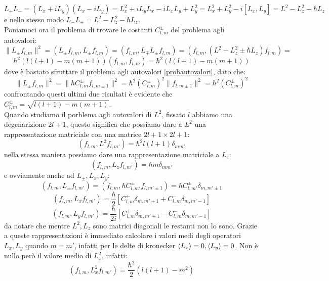 \[L_+L_- = (L_x+iL_y)(L_x-iL_y) = L_x^2 + iL_yL_x -iL_xL_y + L_y^2 = L_x^2+L_y^2 -i[L_x,L_y] = L^2-L_z^2 +\hbar L_z\]
e nello stesso modo $L_-L_+ = L^2-L_z^2-\hbar L_z$.
\\Poniamoci ora il problema di trovare le costanti $C^{\pm}_{l,m}$ del problema agli autovalori:
\[\|L_\pm f_{l,m}\|^2 = (L_\pm f_{l,m}, L_\pm f_{l,m}) = (f_{l,m},L_\mp L_\pm f_{l,m}) = (f_{l,m}, (L^2 -L_z^2\pm \hbar L_z)f_{l,m}) =\]
\[\hbar^2(l(l+1)-m(m+1))(f_{l,m},f_{l,m})=\hbar^2(l(l+1)-m(m+1)) \]
dove è bastato sfruttare il problema agli autovalori \eqref{probautovalori}, dato che:
\[\|L_\pm f_{l,m}\|^2 = \|\hbar C^{\pm}_{l,m} f_{l,m\pm1}\|^2 = \hbar^2 (C^{\pm}_{l,m})^2 \|f_{l,m\pm1}\|^2 = \hbar^2 (C^{\pm}_{l,m})^2\]
confrontando questi ultimi due risultati è evidente che $C^{\pm}_{l,m} = \sqrt{l(l+1)-m(m+1)}$.\\
Quando studiamo il porblema agli autovalori di $L^2$, fissato $l$ abbiamo una degenarizione $2l+1$, questo significa che possiamo dare a $L^2$ una rappresentazione matriciale con una matrice $2l+1\times 2l+1$:
\[(f_{l,m},L^2f_{l,m'}) = \hbar^2 l(l+1) \delta_{mm'}\]
nella stessa maniera possiamo dare una rappresentazione matriciale a $L_z$:
\[(f_{l,m},L_z f_{l,m'}) = \hbar m \delta_{mm'}\]
e ovviamente anche ad $L_\pm,L_x,L_y$:
\[(f_{l,m},L_\pm f_{l,m'}) = (f_{l,m},\hbar C^{\pm}_{l,m'}f_{l,m'\pm 1}) = \hbar C^\pm_{l,m'}\delta_{m,m'\pm1}\]
\[(f_{l,m},L_xf_{l,m'}) = \frac{\hbar}{2}[C^+_{l,m}\delta_{m,m'+1} + C^-_{l,m}\delta_{m,m'-1}]\]
\[ (f_{l,m},L_yf_{l,m'}) = \frac{\hbar}{2i}[C^+_{l,m}\delta_{m,m'+1} - C^-_{l,m}\delta_{m,m'-1}]\]
da notare che mentre $L^2,L_z$ sono matrici diagonali le restanti non lo sono. Grazie a queste rappresentazioni è immediato calcolare i valori medi degli operatori $L_x,L_y$ quando $m=m'$, infatti per le delte di kronecker $\braket{L_x} = 0, \braket{L_y} = 0$. Non è nullo però il valore medio di $L_x^2$, infatti:
\[(f_{l,m},L_x^2 f_{l,m'}) = \frac{\hbar^2}{2}(l(l+1)-m^2)\]
